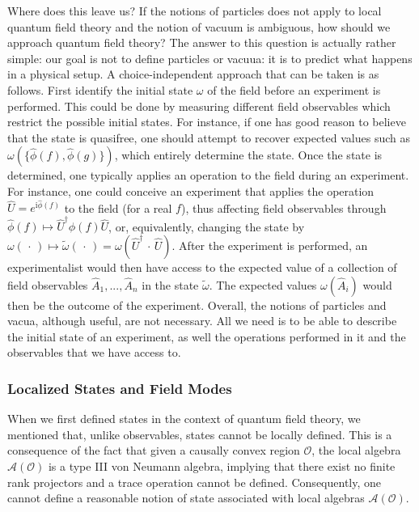 \documentclass[letterpaper,12pt,titlepage,oneside,final]{book}
\newcommand{\ii}{\mathrm{i}}
\begin{document}
Where does this leave us? If the notions of particles does not apply to local quantum field theory and the notion of vacuum is ambiguous, how should we approach quantum field theory? The answer to this question is actually rather simple: our goal is not to define particles or vacuua: it is to predict what happens in a physical setup. A choice-independent approach that can be taken is as follows. First identify the initial state $\omega$ of the field before an experiment is performed. This could be done by measuring different field observables which restrict the possible initial states. For instance, if one has good reason to believe that the state is quasifree, one should attempt to recover expected values such as $\omega(\{\hat{\phi}(f),\hat{\phi}(g)\})$, which entirely determine the state. Once the state is determined, one typically applies an operation to the field during an experiment. For instance, one could conceive an experiment that applies the operation $\hat{U} = e^{\ii \hat{\phi}(f)}$ to the field (for a real $f$), thus affecting field observables through $\hat{\phi}(f)\mapsto \hat{U}^\dagger\hat{\phi}(f)\hat{U}$, or, equivalently, changing the state by $\omega(\,\cdot\,)\mapsto \tilde{\omega}(\,\cdot\,) = \omega(\hat{U}^\dagger\,\cdot\,\hat{U})$. After the experiment is performed, an experimentalist would then have access to the expected value of a collection of field observables $\hat{A}_1,...,\hat{A}_n$ in the state $\tilde{\omega}$. The expected values $\omega(\hat{A}_i)$  would then be the outcome of the experiment. Overall, the notions of particles and vacua, although useful, are not necessary. All we need is to be able to describe the initial state of an experiment, as well the operations performed in it and the observables that we have access to.


\subsubsection*{Localized States and Field Modes}

When we first defined states in the context of quantum field theory, we mentioned that, unlike observables, states cannot be locally defined. This is a consequence of the fact that given a causally convex region $\mathcal{O}$, the local algebra $\mathcal{A}(\mathcal{O})$ is a type III von Neumann algebra, implying that there exist no finite rank projectors and a trace operation cannot be defined. Consequently, one cannot define a reasonable notion of state associated with local algebras $\mathcal{A}(\mathcal{O})$.
\end{document}
